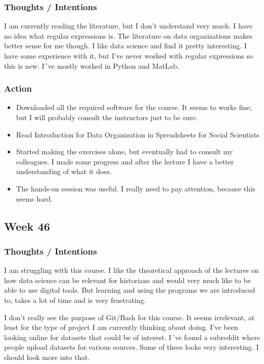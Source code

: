 \documentclass{article}
\begin{document}
\subsubsection{Thoughts / Intentions}

I am currently reading the literature, but I don't understand very much. I have no idea what regular expressions is. The literature on data organizations makes better sense for me though. I like data science and find it pretty interesting.  I have some experience with it, but I've never worked with regular expressions so this is new. I´ve mostly worked in Python and MatLab. 

\subsubsection{Action}

\begin{itemize}
\item Downloaded all the required software for the course. It seems to works fine, but I will probably consult the instructors just to be sure.  
\item Read Introduction for Data Organization in Spreadsheets for Social Scientists
\item Started making the exercises alone, but eventually had to consult my colleagues. I made some progress and after the lecture I have a better understanding of what it does. 
\item The hands-on session was useful. I really need to pay attention, because this seems hard.
\end{itemize}

\pagebreak{}

\subsection{Week 46}
\subsubsection{Thoughts / Intentions}
I am struggling with this course. I like the theoretical approach of the lectures on how data science can be relevant for historians and would very much like to be able to use digital tools. But learning and using the programs we are introduced to, takes a lot of time and is very frustrating. 

I don't really see the purpose of Git/Bash for this course. It seems irrelevant, at least for the type of project I am currently thinking about doing. I've been looking online for datasets that could be of interest. I´ve found a  subreddit where people upload datasets for various sources. Some of thees looks very interesting. I should look more into that. 
\end{document}
